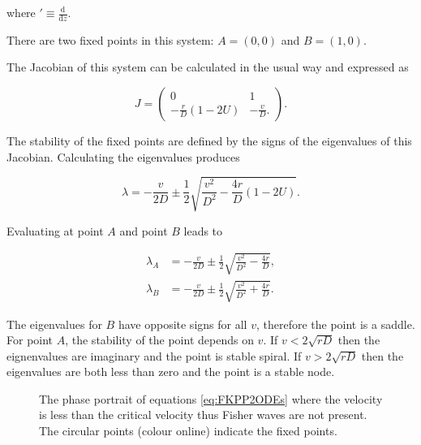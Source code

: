 \documentclass[12pt, a4paper,]{article}
\begin{document}
where $' \equiv \frac{\mathrm{d}}{\mathrm{d}z}$.

There are two fixed points in this system: $A = (0,0)$ and $B = (1,0)$.  

The Jacobian of this system can be calculated in the usual way and expressed as 

\begin{equation}
J  = \begin{pmatrix}
0 & 1 \\
- \frac{r}{D} (1 - 2U) & - \frac{v}{D}.
\end{pmatrix}.
\end{equation}

The stability of the fixed points are defined by the signs of the eigenvalues of this Jacobian. Calculating the eigenvalues produces 

\begin{equation}
\lambda = - \frac{v}{2D} \pm \frac{1}{2} \sqrt{\frac{v^2}{D^2} - \frac{4r}{D} (1-2U)}.
\end{equation}

Evaluating at point $A$ and point $B$ leads to 

\begin{align}
\lambda _A  & = - \frac{v}{2D} \pm \frac{1}{2} \sqrt{\frac{v^2}{D^2} - \frac{4r}{D}}, \\
\lambda _B  & = - \frac{v}{2D} \pm \frac{1}{2} \sqrt{\frac{v^2}{D^2} + \frac{4r}{D}}.
\end{align}

The eigenvalues for $B$ have opposite signs for all $v$, therefore the point is a saddle.
For point $A$, the stability of the point depends on $v$. If $v < 2 \sqrt{rD}$ then the eignenvalues are imaginary and the point is stable spiral. If $v > 2 \sqrt{rD}$ then the eigenvalues are both less than zero and the point is a stable node. 

\begin{figure}[H]
	\begin{subfigure}[h]{0.5\textwidth}
		
	\end{subfigure}%
	\begin{subfigure}[h]{0.5\textwidth}
		
	\end{subfigure}
	\caption{The phase portrait of equations \eqref{eq:FKPP2ODEs}  where the velocity is less than the critical velocity thus Fisher waves are not present. The circular points (colour online) indicate the fixed points.}
	\label{fig:FisherStabilitySpiral}
\end{figure}
\end{document}
